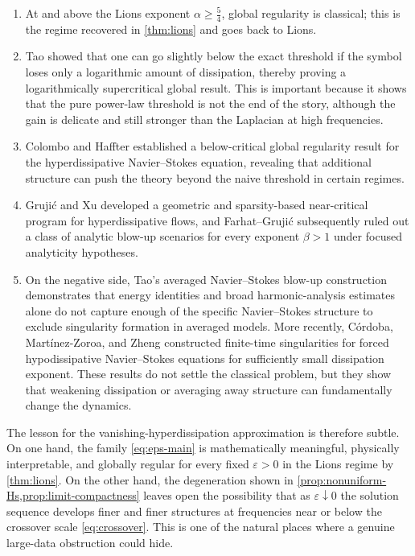 \documentclass[11pt]{article}
\theoremstyle{definition}
\theoremstyle{remark}
\begin{document}
\begin{enumerate}[label=(\alph*)]
\item At and above the Lions exponent $\alpha\ge \frac54$, global regularity is classical; this is the regime recovered in \cref{thm:lions} and goes back to Lions.
\item Tao showed that one can go slightly below the exact threshold if the symbol loses only a logarithmic amount of dissipation, thereby proving a logarithmically supercritical global result. This is important because it shows that the pure power-law threshold is not the end of the story, although the gain is delicate and still stronger than the Laplacian at high frequencies.
\item Colombo and Haffter established a below-critical global regularity result for the hyperdissipative Navier--Stokes equation, revealing that additional structure can push the theory beyond the naive threshold in certain regimes.
\item Gruji\'c and Xu developed a geometric and sparsity-based near-critical program for hyperdissipative flows, and Farhat--Gruji\'c subsequently ruled out a class of analytic blow-up scenarios for every exponent $\beta>1$ under focused analyticity hypotheses.
\item On the negative side, Tao's averaged Navier--Stokes blow-up construction demonstrates that energy identities and broad harmonic-analysis estimates alone do not capture enough of the specific Navier--Stokes structure to exclude singularity formation in averaged models. More recently, C\'ordoba, Mart\'inez-Zoroa, and Zheng constructed finite-time singularities for forced hypodissipative Navier--Stokes equations for sufficiently small dissipation exponent. These results do not settle the classical problem, but they show that weakening dissipation or averaging away structure can fundamentally change the dynamics.
\end{enumerate}

The lesson for the vanishing-hyperdissipation approximation is therefore subtle. On one hand, the family \eqref{eq:eps-main} is mathematically meaningful, physically interpretable, and globally regular for every fixed $\varepsilon>0$ in the Lions regime by \cref{thm:lions}. On the other hand, the degeneration shown in \cref{prop:nonuniform-Hs,prop:limit-compactness} leaves open the possibility that as $\varepsilon\downarrow0$ the solution sequence develops finer and finer structures at frequencies near or below the crossover scale \eqref{eq:crossover}. This is one of the natural places where a genuine large-data obstruction could hide.
\end{document}
